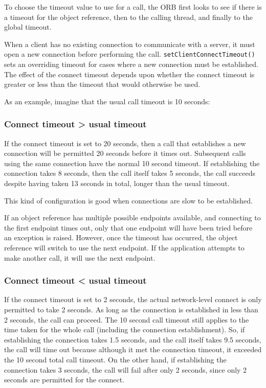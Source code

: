 \documentclass[11pt,twoside,a4paper]{book}
\newcommand{\op}[1]{\texttt{#1()}}
\newcommand{\dsc}{\discretionary{}{}{}}
\begin{document}
To choose the timeout value to use for a call, the ORB first looks to
see if there is a timeout for the object reference, then to the
calling thread, and finally to the global timeout.

When a client has no existing connection to communicate with a server,
it must open a new connection before performing the
call. \op{setClientConnect\dsc{}Timeout} sets an overriding timeout for
cases where a new connection must be established. The effect of the
connect timeout depends upon whether the connect timeout is greater
or less than the timeout that would otherwise be used.

\vspace{\baselineskip}\noindent
As an example, imagine that the usual call timeout is 10 seconds:

\subsubsection*{Connect timeout > usual timeout}

If the connect timeout is set to 20 seconds, then a call that
establishes a new connection will be permitted 20 seconds before it
times out. Subsequent calls using the same connection have the normal
10 second timeout. If establishing the connection takes 8 seconds,
then the call itself takes 5 seconds, the call succeeds despite having
taken 13 seconds in total, longer than the usual timeout.

This kind of configuration is good when connections are slow to be
established.

If an object reference has multiple possible endpoints available, and
connecting to the first endpoint times out, only that one endpoint
will have been tried before an exception is raised. However, once the
timeout has occurred, the object reference will switch to use the next
endpoint. If the application attempts to make another call, it will
use the next endpoint.


\subsubsection*{Connect timeout < usual timeout}

If the connect timeout is set to 2 seconds, the actual network-level
connect is only permitted to take 2 seconds. As long as the connection
is established in less than 2 seconds, the call can proceed. The 10
second call timeout still applies to the time taken for the whole call
(including the connection establishment). So, if establishing the
connection takes 1.5 seconds, and the call itself takes 9.5 seconds,
the call will time out because although it met the connection timeout,
it exceeded the 10 second total call timeout. On the other hand, if
establishing the connection takes 3 seconds, the call will fail after
only 2 seconds, since only 2 seconds are permitted for the connect.
\end{document}

